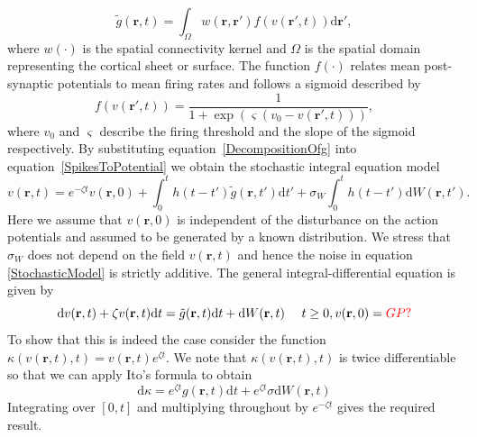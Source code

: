 \documentclass[]{article}
\newcommand{\red}{\textcolor{red}}
\begin{document}
\begin{equation}
	\label{RateBasedInteractions} \tilde{g}\left( \mathbf{r},t \right) = \int_\Omega {w\left( \mathbf{r},\mathbf{r}' \right)f\left( v\left( \mathbf{r}',t \right) \right)\textrm{d}\mathbf{r}'}, 
\end{equation}
where $w(\cdot)$ is the spatial connectivity kernel and $\Omega$ is the spatial domain representing the cortical sheet or surface. The function $f(\cdot)$ relates mean post-synaptic potentials to mean firing rates and follows a sigmoid described by
\begin{equation}
	\label{ActivationFunction} f\left( v\left( \mathbf{r}', t \right) \right) = \frac{1}{1 + \exp \left( \varsigma \left( v_0 - v\left(\mathbf{r}',t\right) \right) \right)}, 
\end{equation}
where $v_0$ and $\varsigma$ describe the firing threshold and the slope of the sigmoid respectively. 
By substituting equation~\ref{DecompositionOfg} into equation~\ref{SpikesToPotential} we obtain the stochastic integral equation model 
\begin{equation}
	\label{StochasticModel} v\left(\mathbf{r},t\right) = e^{-\zeta t}v\left( {\mathbf{r},0} \right) +
	\int_{0}^t h\left(t - t'\right)\tilde{g}\left(\mathbf{r},t'\right) \textrm{d}t'+ \sigma_W\int_{0}^t h\left(t - t'\right)\textrm{d}W\left(\mathbf{r},t'\right).
\end{equation}
 Here we assume that $v\left( {\mathbf{r}},0 \right)$ is independent of the disturbance on the action potentials and assumed to be generated by a known distribution. We stress that $\sigma_W$ does not depend on the field $v({\mathbf{r}},t)$ and hence the noise in equation \ref{StochasticModel} is strictly additive. The general integral-differential equation is given by 
\begin{equation} \label{DifferentialEquationContTime}
 \textrm{d}v(\mathbf{r},t) + \zeta v(\mathbf{r},t)\textrm{d}t = \tilde{g}(\mathbf{r},t)\textrm{d}t + \textrm{d}W(\mathbf{r},t)  ~~~~ t \ge 0, v(\mathbf{r},0) = \red{GP?}
\end{equation}
To show that this is indeed the case consider the function $\kappa(v(\mathbf{r},t),t) = v(\mathbf{r},t)e^{\zeta t}$. We note that $\kappa(v(\mathbf{r},t),t)$ is twice differentiable so that we can apply Ito's formula to obtain
\begin{equation}
 \textrm{d}\kappa = e^{\zeta t}g(\mathbf{r},t)\textrm{d}t + e^{\zeta t}\sigma \textrm{d}W(\mathbf{r},t)
\end{equation}
\noindent Integrating over $[0,t]$ and multiplying throughout by $e^{-\zeta t}$ gives the required result.
\end{document}
